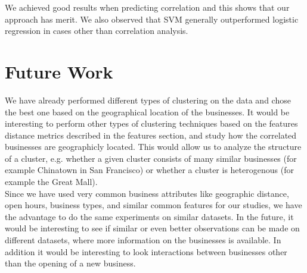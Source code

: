 \documentclass{vldb}
\begin{document}
We achieved good results when predicting correlation and this shows that our approach has merit.
We also observed that SVM generally outperformed logistic regression in cases other than correlation analysis.

\section{Future Work}
We have already performed different types of clustering on the data and chose the best one based on the geographical location of the businesses. It would be interesting to perform other types of clustering techniques based on the features distance metrics described in the features section, and study how the correlated businesses are geographicly located. This would allow us to analyze the structure of a cluster, e.g. whether a given cluster consists of many similar businesses (for example Chinatown in San Francisco) or whether a cluster is heterogenous (for example the Great Mall).\\
Since we have used very common business attributes like geographic distance, open hours, business types, and similar common features for our studies, we have the advantage to do the same experiments on similar datasets. In the future, it would be interesting to see if similar or even better observations can be made on different datasets, where more information on the businesses is available. In addition it would be interesting to look interactions between businesses other than the opening of a new business.


\end{document}
